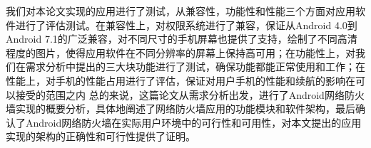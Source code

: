 \documentclass[format=final, language=chinese, degree=fyp]{hustthesis}
\begin{document}
我们对本论文实现的应用进行了测试，从兼容性，功能性和性能三个方面对应用软件进行了评估测试。在兼容性上，对权限系统进行了兼容，保证从Android 4.0到Android 7.1的广泛兼容，对不同尺寸的手机屏幕也提供了支持，绘制了不同高清程度的图片，使得应用软件在不同分辨率的屏幕上保持高可用；在功能性上，对我们在需求分析中提出的三大块功能进行了测试，确保功能都能正常使用和工作；在性能上，对手机的性能占用进行了评估，保证对用户手机的性能和续航的影响在可以接受的范围之内
总的来说，这篇论文从需求分析出发，进行了Android网络防火墙实现的概要分析，具体地阐述了网络防火墙应用的功能模块和软件架构，最后确认了Android网络防火墙在实际用户环境中的可行性和可用性，对本文提出的应用实现的架构的正确性和可行性提供了证明。


\backmatter



\end{document}
